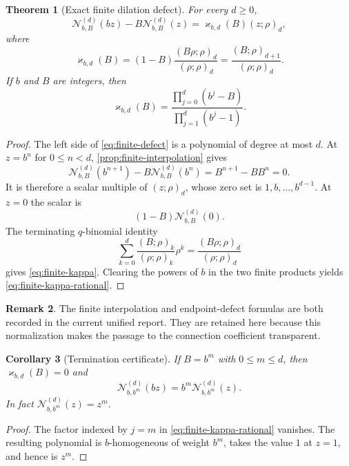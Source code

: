 \documentclass[11pt]{article}
\newtheorem{theorem}{Theorem}[section]
\newtheorem{corollary}[theorem]{Corollary}
\theoremstyle{definition}
\newtheorem{remark}[theorem]{Remark}
\newcommand{\Nker}{\mathscr{N}}
\newcommand{\kk}{\varkappa}
\newcommand{\qpf}[3]{\left(#1;#2\right)_{#3}}
\begin{document}
\begin{theorem}[Exact finite dilation defect]\label{thm:finite-defect}
For every $d\ge0$,
\begin{equation}\label{eq:finite-defect}
 \Nker^{(d)}_{b,B}(bz)-B\Nker^{(d)}_{b,B}(z)
 =\kk_{b,d}(B)\qpf{z}{\rho}{d},
\end{equation}
where
\begin{equation}\label{eq:finite-kappa}
 \kk_{b,d}(B)
 =(1-B)\frac{\qpf{B\rho}{\rho}{d}}{\qpf{\rho}{\rho}{d}}
 =\frac{\qpf{B}{\rho}{d+1}}{\qpf{\rho}{\rho}{d}}.
\end{equation}
If $b$ and $B$ are integers, then
\begin{equation}\label{eq:finite-kappa-rational}
 \kk_{b,d}(B)=
 \frac{\displaystyle\prod_{j=0}^{d}(b^j-B)}
      {\displaystyle\prod_{j=1}^{d}(b^j-1)}.
\end{equation}
\end{theorem}

\begin{proof}
The left side of \eqref{eq:finite-defect} is a polynomial of degree at most $d$.  At $z=b^n$ for $0\le n<d$, \cref{prop:finite-interpolation} gives
\[
 \Nker^{(d)}_{b,B}(b^{n+1})-B\Nker^{(d)}_{b,B}(b^n)
 =B^{n+1}-BB^n=0.
\]
It is therefore a scalar multiple of $\qpf{z}{\rho}{d}$, whose zero set is $1,b,\dots,b^{d-1}$.  At $z=0$ the scalar is
\[
 (1-B)\Nker^{(d)}_{b,B}(0).
\]
The terminating $q$-binomial identity
\[
 \sum_{k=0}^{d}\frac{\qpf{B}{\rho}{k}}{\qpf{\rho}{\rho}{k}}\rho^k
 =\frac{\qpf{B\rho}{\rho}{d}}{\qpf{\rho}{\rho}{d}}
\]
gives \eqref{eq:finite-kappa}.  Clearing the powers of $b$ in the two finite products yields \eqref{eq:finite-kappa-rational}.
\end{proof}

\begin{remark}
The finite interpolation and endpoint-defect formulas are both recorded in the current
unified report.  They are retained here because this normalization makes the passage to the
connection coefficient transparent.
\end{remark}

\begin{corollary}[Termination certificate]\label{cor:finite-termination}
If $B=b^m$ with $0\le m\le d$, then $\kk_{b,d}(B)=0$ and
\[
 \Nker^{(d)}_{b,b^m}(bz)=b^m\Nker^{(d)}_{b,b^m}(z).
\]
In fact $\Nker^{(d)}_{b,b^m}(z)=z^m$.
\end{corollary}

\begin{proof}
The factor indexed by $j=m$ in \eqref{eq:finite-kappa-rational} vanishes.  The resulting polynomial is $b$-homogeneous of weight $b^m$, takes the value $1$ at $z=1$, and hence is $z^m$.
\end{proof}
\end{document}
